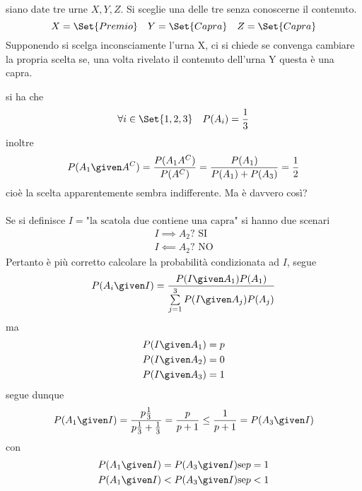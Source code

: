 \documentclass{subfiles}
\begin{document}
\begin{Exercise*}
    siano date tre urne \(X, Y, Z\). Si sceglie una delle tre senza conoscerne il contenuto.
    \[
        X = \Set{Premio} \quad Y = \Set{Capra} \quad Z = \Set{Capra}
    \]
    Supponendo si scelga inconsciamente l'urna X, ci si chiede se convenga cambiare la propria scelta se, una volta rivelato il contenuto dell'urna Y questa è una capra.

    \begin{Solution*}
        si ha che
        \[
            \forall i \in \Set{1, 2, 3} \quad P(A_{i}) = \frac{1}{3}
        \]
        inoltre
        \[
            P(A_{1} \given A^{C}) = \frac{P(A_{1}A^{C})}{P(A^{C})} = \frac{P(A_{1})}{P(A_{1}) + P(A_{3})} = \frac{1}{2}
        \]
        cioè la scelta apparentemente sembra indifferente. Ma è davvero così?
        \\ \\
        Se si definisce \(I = \text{"la scatola due contiene una capra"}\) si hanno due scenari
        \[\begin{gathered}
                I \implies A_{2} \text{? SI} \\
                I \impliedby A_{2} \text{? NO}
            \end{gathered}\]
        Pertanto è più corretto calcolare la probabilità condizionata ad \(I\), segue
        \[
            P(A_{i} \given I) = \frac{P(I \given A_{1})P(A_{1})}{\sum\limits_{j = 1}^{3}{P(I \given A_{j})P(A_{j})}}
        \]
        ma
        \[\begin{gathered}
                P(I \given A_{1}) = p \\
                P(I \given A_{2}) = 0 \\
                P(I \given A_{3}) = 1 \\
            \end{gathered}\]
        segue dunque
        \[
            P(A_{1} \given I) = \frac{p\frac{1}{3}}{p\frac{1}{3} + \frac{1}{3}} = \frac{p}{p + 1} \leq \frac{1}{p + 1} = P(A_{3} \given I)
        \]
        con
        \[\begin{gathered}
                P(A_{1} \given I) = P(A_{3} \given I) \text{se} p = 1 \\
                P(A_{1} \given I) < P(A_{3} \given I) \text{se} p < 1\\
            \end{gathered}\]
    \end{Solution*}
\end{Exercise*}
\clearpage
\end{document}
